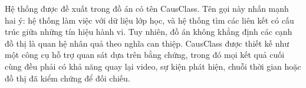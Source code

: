 Hệ thống được đề xuất trong đồ án có tên CausClass. Tên gọi này nhấn mạnh hai ý: hệ thống làm việc với dữ liệu lớp học, và hệ thống tìm các liên kết có cấu trúc giữa những tín hiệu hành vi. Tuy nhiên, đồ án không khẳng định các cạnh đồ thị là quan hệ nhân quả theo nghĩa can thiệp. CausClass được thiết kế như một công cụ hỗ trợ quan sát dựa trên bằng chứng, trong đó mọi kết quả cuối cùng đều phải có khả năng quay lại video, sự kiện phát hiện, chuỗi thời gian hoặc đồ thị đã kiểm chứng để đối chiếu.